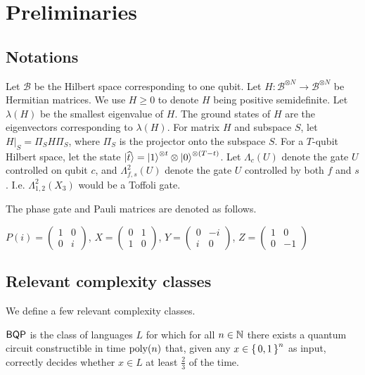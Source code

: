 \section{Preliminaries}

\subsection{Notations}

Let $\mathcal{B}$ be the Hilbert space corresponding to one qubit. Let $H:\mathcal{B}^{\otimes N}\rightarrow\mathcal{B}^{\otimes N}$ be Hermitian matrices. We use $H\geq0$ to denote $H$ being positive semidefinite. Let $\lambda(H)$ be the smallest eigenvalue of $H$. The ground states of $H$ are the eigenvectors corresponding to $\lambda(H)$. For matrix $H$ and subspace $S$, let $H\big|_S=\Pi_S H \Pi_S$, where $\Pi_S$ is the projector onto the subspace $S$. For a $T$-qubit Hilbert space, let the state $\ket{\widehat{t}}=\ket{1}^{\otimes t}\otimes \ket{0}^{{\otimes (T-t)}}$. Let $\Lambda_c(U)$ denote the gate $U$ controlled on qubit $c$, and $\Lambda^2_{f, s}(U)$ denote the gate $U$ controlled by both $f$ and $s$. I.e. $\Lambda^2_{1, 2}(X_3)$ would be a Toffoli gate. 

The phase gate and Pauli matrices are denoted as follows.

\begin{definition}
	$P(i)=\begin{pmatrix}1&0\\0&i\end{pmatrix}$, $X=\begin{pmatrix}0&1\\1&0\end{pmatrix}$,
	$Y=\begin{pmatrix}0&-i\\i&0\end{pmatrix}$,
	$Z=\begin{pmatrix}1&0\\0&-1\end{pmatrix}$
\end{definition}

\subsection{Relevant complexity classes}

We define a few relevant complexity classes.

\begin{definition} [$\BQP$]
	$\BQP$ is the class of languages $L$ for which for all $n\in\mathbb{N}$ there exists a quantum circuit constructible in time $\operatorname*{\operatorname{poly}}(n)$ that, given any $x\in\set{0, 1}^n$ as input, correctly decides whether $x\in L$ at least $\frac{2}{3}$ of the time.
\end{definition}

